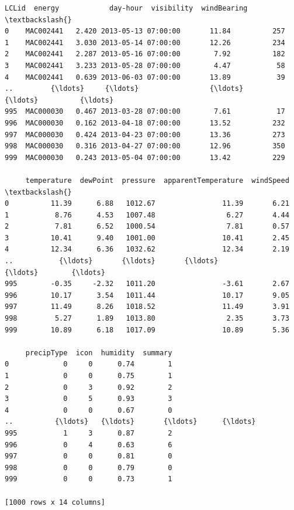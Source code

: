 \documentclass[11pt]{article}
\makeatletter
\newcommand{\boxspacing}{\kern\kvtcb@left@rule\kern\kvtcb@boxsep}
\newcommand{\prompt}[4]{
        {\ttfamily\llap{{\color{#2}[#3]:\hspace{3pt}#4}}\vspace{-\baselineskip}}
    }
\makeatother
\begin{document}
            \begin{tcolorbox}[breakable, size=fbox, boxrule=.5pt, pad at break*=1mm, opacityfill=0]
\prompt{Out}{outcolor}{153}{\boxspacing}
\begin{Verbatim}[commandchars=\\\{\}]
         LCLid  energy            day-hour  visibility  windBearing  \textbackslash{}
0    MAC002441   2.420 2013-05-13 07:00:00       11.84          257
1    MAC002441   3.030 2013-05-14 07:00:00       12.26          234
2    MAC002441   2.287 2013-05-16 07:00:00        7.92          182
3    MAC002441   3.233 2013-05-28 07:00:00        4.47           58
4    MAC002441   0.639 2013-06-03 07:00:00       13.89           39
..         {\ldots}     {\ldots}                 {\ldots}         {\ldots}          {\ldots}
995  MAC000030   0.467 2013-03-28 07:00:00        7.61           17
996  MAC000030   0.162 2013-04-18 07:00:00       13.52          232
997  MAC000030   0.424 2013-04-23 07:00:00       13.36          273
998  MAC000030   0.316 2013-04-27 07:00:00       12.96          350
999  MAC000030   0.243 2013-05-04 07:00:00       13.42          229

     temperature  dewPoint  pressure  apparentTemperature  windSpeed  \textbackslash{}
0          11.39      6.88   1012.67                11.39       6.21
1           8.76      4.53   1007.48                 6.27       4.44
2           7.81      6.52   1000.54                 7.81       0.57
3          10.41      9.40   1001.00                10.41       2.45
4          12.34      6.36   1032.62                12.34       2.19
..           {\ldots}       {\ldots}       {\ldots}                  {\ldots}        {\ldots}
995        -0.35     -2.32   1011.20                -3.61       2.67
996        10.17      3.54   1011.44                10.17       9.05
997        11.49      8.26   1018.52                11.49       3.91
998         5.27      1.89   1013.80                 2.35       3.73
999        10.89      6.18   1017.09                10.89       5.36

     precipType  icon  humidity  summary
0             0     0      0.74        1
1             0     0      0.75        1
2             0     3      0.92        2
3             0     5      0.93        3
4             0     0      0.67        0
..          {\ldots}   {\ldots}       {\ldots}      {\ldots}
995           1     3      0.87        2
996           0     4      0.63        6
997           0     0      0.81        0
998           0     0      0.79        0
999           0     0      0.73        1

[1000 rows x 14 columns]
\end{Verbatim}
\end{tcolorbox}
        
\end{document}
